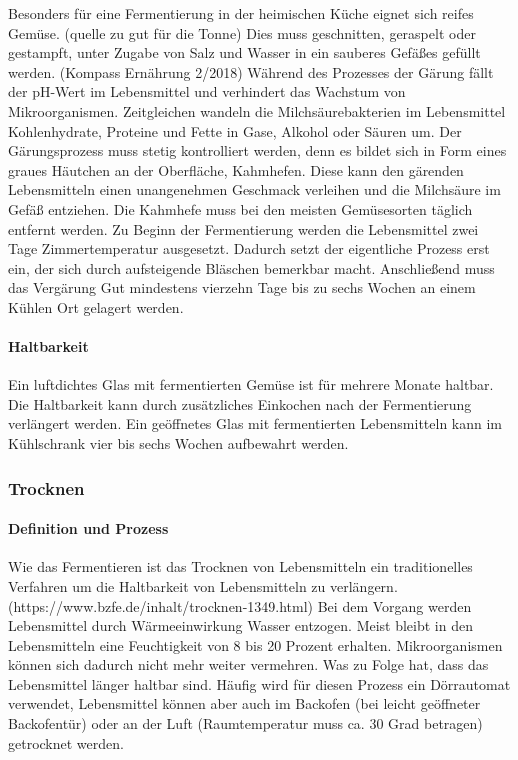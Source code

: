 Besonders für eine Fermentierung in der heimischen Küche eignet sich reifes Gemüse. (quelle zu gut für die Tonne) Dies muss geschnitten, geraspelt oder gestampft, unter Zugabe von Salz und Wasser in ein sauberes Gefäßes gefüllt werden. (Kompass Ernährung 2/2018) Während des Prozesses der Gärung fällt der pH-Wert im Lebensmittel und verhindert das Wachstum von Mikroorganismen. %
Zeitgleichen wandeln die Milchsäurebakterien im Lebensmittel Kohlenhydrate, Proteine und Fette in Gase, Alkohol oder Säuren um. %
Der Gärungsprozess muss stetig kontrolliert werden, denn es bildet sich in Form eines graues Häutchen an der Oberfläche, Kahmhefen. Diese kann den gärenden Lebensmitteln einen unangenehmen Geschmack verleihen und die Milchsäure im Gefäß entziehen. Die Kahmhefe muss bei den meisten Gemüsesorten täglich entfernt werden. Zu Beginn der Fermentierung werden die Lebensmittel zwei Tage Zimmertemperatur ausgesetzt. Dadurch setzt der eigentliche Prozess erst ein, der sich durch aufsteigende Bläschen bemerkbar macht. Anschließend muss das Vergärung Gut mindestens vierzehn Tage bis zu sechs Wochen an einem Kühlen Ort gelagert werden.



\paragraph{Haltbarkeit}
 Ein luftdichtes Glas mit fermentierten Gemüse ist für mehrere Monate haltbar. Die Haltbarkeit kann durch zusätzliches Einkochen nach der Fermentierung verlängert werden. Ein geöffnetes Glas mit fermentierten Lebensmitteln kann im Kühlschrank vier bis sechs Wochen aufbewahrt werden. %
\subsubsection{Trocknen}
\paragraph{Definition und Prozess}
Wie das Fermentieren ist das Trocknen von Lebensmitteln ein traditionelles Verfahren um die Haltbarkeit von Lebensmitteln zu verlängern. (https://www.bzfe.de/inhalt/trocknen-1349.html) Bei dem Vorgang werden Lebensmittel durch Wärmeeinwirkung Wasser entzogen. Meist bleibt in den Lebensmitteln eine Feuchtigkeit von 8 bis 20 Prozent erhalten. Mikroorganismen können sich dadurch nicht mehr weiter vermehren. Was zu Folge hat, dass das Lebensmittel länger haltbar sind. Häufig wird für diesen Prozess ein Dörrautomat verwendet, Lebensmittel können aber auch im Backofen (bei leicht geöffneter Backofentür) oder an der Luft (Raumtemperatur muss ca. 30 Grad betragen) getrocknet werden.  %

